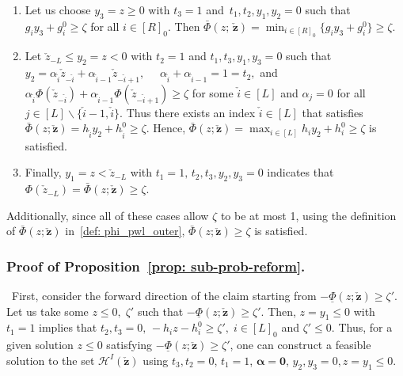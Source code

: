 \documentclass[opre,sglanonrev]{informs4}
\newcommand{\mH}{\mathcal{H}}
\newcommand{\zz}{\check{z}}
\newcommand{\bzz}{\bm{\zz}}
\newcommand{\balpha}{\bm{\alpha}}
\newcommand{\bzero}{\bm{0}}
\begin{document}
{\begin{APPENDICES}
\begin{enumerate}
    \item[i)] Let us choose $ y_3 = z \geq 0$ with $t_3 = 1$ and $ \, t_1, t_2, y_1, y_2 = 0$ such that $ g_i y_3 + g_i^0 \geq \zeta$ for all $i \in [R]_0$. Then  $\bar{\Phi} \left(z ; \, \bzz\right) = \min_{i \in [R]_0} \{ g_i y_3 + g_i^0\} \geq \zeta$.
    \item[ii)] Let $\zz_{-L} \leq y_2 = z < 0$ with $ t_2=1$ and  $t_1, t_3, y_1, y_3 = 0$ such that $y_2 = \alpha_{\check{i}} \zz_{-\check{i}} + \alpha_{\check{i} - 1} \zz_{-\check{i} + 1}, \quad$  $\alpha_{\check{i}} + \alpha_{\check{i} - 1} = 1 = t_2, $ and $ \alpha_{\check{i}} \Phi(\zz_{-\check{i}}) + \alpha_{\check{i} - 1}  \Phi(\zz_{-\check{i} + 1}) \geq \zeta $ for some $\check{i} \in [L]$ and $\alpha_{j} = 0$ for all $j \in [L] \backslash \{\check{i} - 1, \check{i} \}$. Thus there exists an index $\check{i} \in [L]$ that satisfies $\bar{\Phi} \left(z ; \bzz\right) =  h_{\check{i}} y_2 + h_{\check{i}}^0  \geq \zeta$. Hence, $\bar{\Phi} \left(z ; \bzz\right) =  \max_{i \in [L]}h_{i} y_2 + h_{i}^0  \geq \zeta$ is satisfied.
    \item[iii)] Finally, $ y_1 = z < \check{z}_{-L}$ with $ t_1 = 1, \, t_2, t_3, y_2, y_3 = 0$ indicates that $\Phi(\zz_{-L}) = \bar{\Phi} \left(z ; \bzz\right) \geq \zeta$. 
\end{enumerate}
Additionally, since all of these cases allow $\zeta$ to be at most 1, using the definition of $\bar{\Phi}(z; \bzz)$ in~\eqref{def: phi_pwl_outer}, $\bar{\Phi}(z; \bzz)  \geq \zeta$ is satisfied. \hfill\qedsymbol

\subsubsection{Proof of Proposition~\ref{prop: sub-prob-reform}.}\, First, consider the forward direction of the claim starting from $-\underline{\Phi} \left(z ; \bzz\right)  \geq \zeta'$. Let us take some $z\leq 0, \; \zeta'$ such that $-\underline{\Phi}(z; \bzz) \geq \zeta'$. Then, $z = y_1 \leq 0$ with $t_1 = 1$ implies that $t_2, t_3 = 0, \, -h_i z - h_i^0 \geq \zeta', \; i \in [L]_0$ and $\zeta' \leq 0$. Thus, for a given solution $z \leq 0$ satisfying $-\underline{\Phi}(z; \bzz) \geq \zeta'$, one can construct a feasible solution to the set $\mH^I(\bzz)$ using $t_3, t_2 = 0$, $t_1 = 1$, $\balpha = \bzero$, $y_2, y_3 = 0, z = y_1 \leq 0$. 


\end{APPENDICES}}
\end{document}
